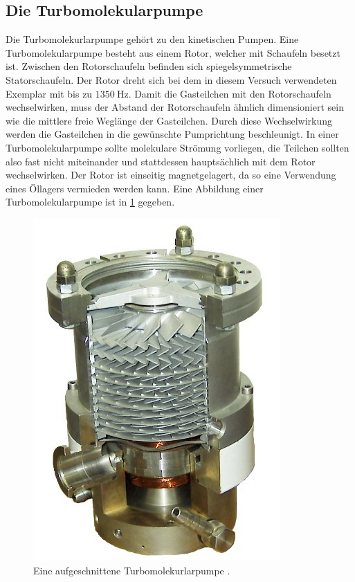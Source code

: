 \subsection{Die Turbomolekularpumpe}
Die Turbomolekurlarpumpe gehört zu den kinetischen Pumpen. Eine Turbomolekularpumpe besteht
aus einem Rotor, welcher mit Schaufeln besetzt ist. Zwischen den Rotorschaufeln befinden sich
spiegelsymmetrische Statorschaufeln. Der Rotor dreht sich bei dem in diesem Versuch verwendeten
Exemplar mit bis zu $\SI{1350}{\hertz}$. Damit die Gasteilchen mit den Rotorschaufeln wechselwirken,
muss der Abstand der Rotorschaufeln ähnlich dimensioniert sein wie die mittlere freie Weglänge der
Gasteilchen. Durch diese Wechselwirkung werden die Gasteilchen in die
gewünschte Pumprichtung beschleunigt. In einer Turbomolekularpumpe sollte molekulare Strömung vorliegen, die Teilchen
sollten also fast nicht miteinander und stattdessen hauptsächlich mit dem Rotor wechselwirken.
Der Rotor ist einseitig magnetgelagert, da so eine Verwendung eines Öllagers vermieden werden kann.
Eine Abbildung einer Turbomolekularpumpe ist in \ref{fig:turbomolekular} gegeben.
\begin{figure}
 \centering
 \caption{Eine aufgeschnittene Turbomolekurlarpumpe \cite{turbopumpenbild}.}
 \label{fig:turbomolekular}
 \includegraphics[scale=0.3]{pictures/Cut_through_turbomolecular_pump.jpg}
\end{figure}
\noindent

